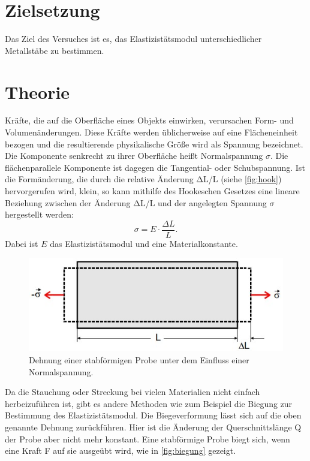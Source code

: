 \section{Zielsetzung}
\label{sec:Zielsetzung}
Das Ziel des Versuches ist es, das Elastizistätsmodul unterschiedlicher Metallstäbe zu bestimmen.

\section{Theorie}
\label{sec:Theorie}

Kräfte, die auf die Oberfläche eines Objekts einwirken, verursachen Form- und Volumenänderungen. Diese Kräfte werden üblicherweise auf eine Flächeneinheit bezogen und die resultierende physikalische Größe wird als Spannung bezeichnet. 
Die Komponente senkrecht zu ihrer Oberfläche heißt Normalspannung $\sigma$.
Die flächenparallele Komponente ist dagegen die Tangential- oder Schubspannung. 
Ist die Formänderung, die durch die relative Änderung ΔL/L (siehe \autoref{fig:hook}) hervorgerufen wird, klein, so kann mithilfe des Hookeschen Gesetzes eine lineare Beziehung zwischen
der Änderung ΔL/L und der angelegten Spannung $\sigma$ hergestellt werden:
\begin{equation}\label{eq:hook}
    \sigma = E \cdot \frac{\Delta L}{L}.
\end{equation}
Dabei ist $E$ das Elastizistätsmodul und eine Materialkonstante.
\begin{figure}[H]
    \includegraphics[width=\linewidth]{img/abb1.jpg}
    \caption{Dehnung einer stabförmigen Probe unter dem Einfluss einer Normalspannung.}
    \label{fig:hook}
\end{figure}
Da die Stauchung oder Streckung bei vielen Materialien nicht einfach herbeizuführen ist, gibt es andere Methoden wie zum Beispiel die 
Biegung zur Bestimmung des Elastizistätsmodul.
Die Biegeverformung lässt sich auf die oben genannte Dehnung zurückführen. Hier ist die Änderung der Querschnittslänge Q der Probe aber nicht mehr konstant. 
Eine stabförmige Probe biegt sich, wenn eine Kraft F auf sie ausgeübt wird, wie in \autoref{fig:biegung} gezeigt.
